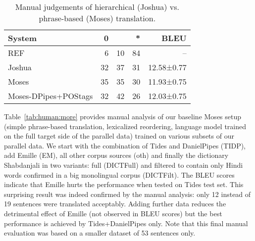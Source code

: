 \documentclass[11pt]{article}
\def\Tref#1{Table~\ref{#1}}
\begin{document}
\begin{table}[ht]
\begin{small}
\begin{centering}
\begin{tabular}{l|r|r|r|r}
{\bf System} & {\bf 0} & {\bf*} & {\bf**} & {\bf BLEU}\\
\hline
REF   &  6   &   10    &  84   &  -- \\ 
Joshua  &  32   &  37   &  31   &   12.58±0.77\\
Moses  &  35  &   35   &  30   &  11.93±0.75\\
Moses-DPipes+POStags  & 32  &   42   &  26   &  12.03±0.75\\
\end{tabular}
\caption{%
Manual judgements of hierarchical (Joshua) vs. phrase-based (Moses) translation.
}
\label{tab:human:mojo}
\end{centering}
\end{small}
\end{table}

\Tref{tab:human:more} provides manual analysis of our baseline Moses setup
(simple
phrase-based translation, lexicalized reordering, language model trained on the
full target side of the parallel data) trained on various subsets of
our parallel data. We start with the combination of Tides and DanielPipes
(TIDP), add Emille (EM), all other corpus sources (oth) and finally the
dictionary Shabdanjali in two variants: full (DICTFull) and filtered to contain
only Hindi words confirmed in a big monolingual corpus (DICTFilt). The BLEU
scores indicate that Emille hurts the performance when tested on Tides test
set. This surprising result was indeed confirmed by the manual analysis: only 12
instead of 19 sentences were translated acceptably. Adding further data reduces
the detrimental effect of Emille (not observed in BLEU scores) but the best
performance is achieved by
Tides+DanielPipes only.  Note that this final manual evaluation was based on a
smaller dataset of 53 sentences only.
\end{document}

